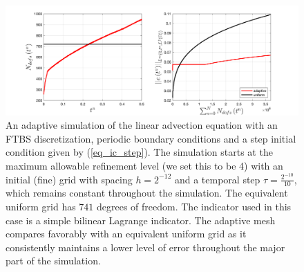 \documentclass[final]{amsart}
\numberwithin{equation}{section}
\begin{document}
\begin{figure}[H]
\centering
\includegraphics[width=\textwidth]{../figures/fig_FTBSplots_1x5_step_IC_P1_comparison_adaptONOFF}	
	\caption{\label{fig:FTBS_linadvect_adapt} An adaptive simulation of the linear advection equation with an FTBS discretization, periodic boundary conditions and a step initial condition given by (\ref{eq_ic_step}).  The simulation starts at the maximum allowable refinement level (we set this to be 4) with an initial (fine) grid with spacing $h=2^{-12}$ and a temporal step $\tau =\frac{2^{-10}}{10}$, which remains constant throughout the simulation. The equivalent uniform grid has $741$ degrees of freedom.  The indicator used in this case is a simple bilinear Lagrange indicator.  The adaptive mesh compares favorably with an equivalent uniform grid as it consistently maintains a lower level of error throughout the major part of the simulation.}
\end{figure}
\end{document}
